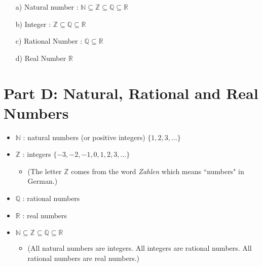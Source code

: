 \documentclass[11pt,a4paper,titlepage,oneside,openany]{article}
\numberwithin{equation}{section}
\numberwithin{algorithm}{section}
\numberwithin{figure}{section}
\numberwithin{table}{section}
\newcommand{\mb}{\mathbb}
\begin{document}
{\begin{enumerate}
    \begin{itemize}
    \item[a)] Natural number : $\mb{N} \subseteq \mb{Z } \subseteq \mb{Q} \subseteq \mb{R}$
    \item[b)] Integer : $ \mb{Z } \subseteq \mb{Q} \subseteq \mb{R}$
    \item[c)] Rational Number : $ \mb{Q} \subseteq \mb{R}$
    \item[d)] Real Number $\mb{R}$

    \end{itemize}

\end{enumerate}





\section*{Part D: Natural, Rational and Real Numbers}
\begin{itemize}
\item $\mb{N}$ : natural numbers (or positive integers) $\{1,2,3,\ldots\}$
\item $\mb{Z}$ : integers $\{-3,-2,-1,0,1,2,3,\ldots\}$
\begin{itemize}
\item (The letter $\mb{Z}$ comes from the word \emph{Zahlen} which means ``numbers" in German.)
\end{itemize}
\item $\mb{Q}$ : rational numbers
\item $\mb{R}$ : real numbers
\item $\mb{N} \subseteq \mb{Z } \subseteq \mb{Q} \subseteq \mb{R}$
\begin{itemize}
\item (All natural numbers are integers. All integers are rational numbers. All rational numbers are real numbers.)
\end{itemize}
\end{itemize}
\newpage


}
\end{document}
